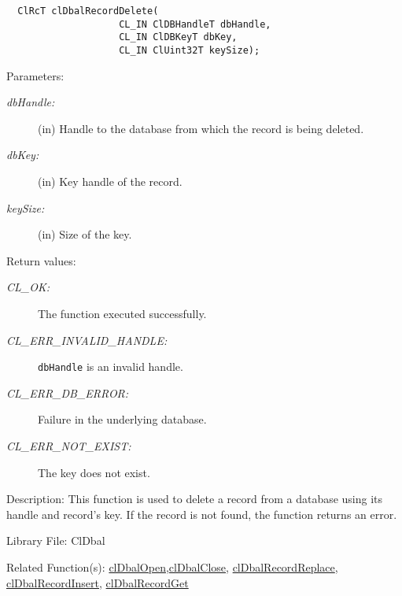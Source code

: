 \begin{flushleft}
\begin{Desc}
\footnotesize\begin{verbatim}  ClRcT clDbalRecordDelete(
					CL_IN ClDBHandleT dbHandle,
					CL_IN ClDBKeyT dbKey,
					CL_IN ClUint32T keySize);
\end{verbatim}
\normalsize
\end{Desc}
\begin{Desc}
\item[Parameters:]
\begin{description}
\item[{\em db\-Handle:}](in) Handle to the database from which the record is being deleted. \item[{\em db\-Key:}](in) Key handle of the record. 
\item[{\em key\-Size:}](in) Size of the key.\end{description}
\end{Desc}
\begin{Desc}
\item[Return values:]
\begin{description}
\item[{\em CL\_\-OK:}]The function executed successfully. 
\item[{\em CL\_\-ERR\_\-INVALID\_\-HANDLE:}]{\tt{dbHandle}} is an invalid handle. 
\item[{\em CL\_\-ERR\_\-DB\_\-ERROR:}]Failure in the underlying database. 
\item[{\em CL\_\-ERR\_\-NOT\_\-EXIST:}]The key does not exist.\end{description}
\end{Desc}
\begin{Desc}
\item[Description:]This function is used to delete a record from a database using its handle and record's key. If the record is not found, the function 
returns an error.\end{Desc}
\begin{Desc}
\item[Library File:]Cl\-Dbal\end{Desc}
\begin{Desc}
\item[Related Function(s):]\hyperlink{pagedbal103}{cl\-Dbal\-Open},\hyperlink{pagedbal104}{cl\-Dbal\-Close},
\hyperlink{pagedbal106}{cl\-Dbal\-Record\-Replace}, \hyperlink{pagedbal105}{cl\-Dbal\-Record\-Insert}, 
\hyperlink{pagedbal107}{cl\-Dbal\-Record\-Get} \end{Desc}


\newpage

\end{flushleft}
